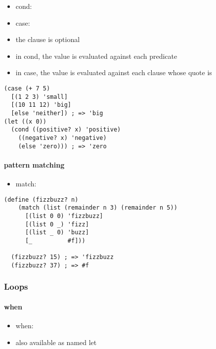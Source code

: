 \documentclass[a4paper,landscape,10pt]{article}
\begin{document}
\begin{multicols*}{2}
  \begin{itemize}
    \item cond: 
    \item case: 
    \item the  clause is optional
    \item in cond, the value is evaluated against each predicate
    \item in case, the value is evaluated against each clause whose quote is 
  \end{itemize}

  \begin{lstlisting}[language=Racket]
(case (+ 7 5)
  [(1 2 3) 'small]
  [(10 11 12) 'big]
  [else 'neither]) ; => 'big
(let ((x 0))
  (cond ((positive? x) 'positive)
    ((negative? x) 'negative)
    (else 'zero))) ; => 'zero
  \end{lstlisting}

  \paragraph{pattern matching}

  \begin{itemize}
    \item match: 
  \end{itemize}

  \begin{lstlisting}[language=Racket]
    (define (fizzbuzz? n)
    (match (list (remainder n 3) (remainder n 5))
      [(list 0 0) 'fizzbuzz]
      [(list 0 _) 'fizz]
      [(list _ 0) 'buzz]
      [_          #f]))

  (fizzbuzz? 15) ; => 'fizzbuzz
  (fizzbuzz? 37) ; => #f
  \end{lstlisting}

  \breakcolumn

  \subsubsection{Loops}

  \paragraph{when}

  \begin{itemize}
    \item when: 
    \item also available as named let
  \end{itemize}


\end{multicols*}
\end{document}
